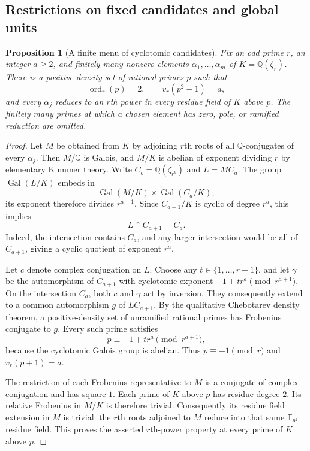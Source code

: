 \documentclass[11pt]{article}
\newcommand{\ord}{\operatorname{ord}}
\newtheorem{proposition}[theorem]{Proposition}
\theoremstyle{definition}
\theoremstyle{remark}
\begin{document}
\subsection{Restrictions on fixed candidates and global units}
\label{subsec:candidate-barriers}

\begin{proposition}[A finite menu of cyclotomic candidates]
\label{prop:fixed-cyclotomic-menu}
Fix an odd prime $r$, an integer $a\ge2$, and finitely many nonzero
elements $\alpha_1,\ldots,\alpha_m$ of $K=\mathbb Q(\zeta_r)$.
There is a positive-density set of rational primes $p$ such that
\[
 \ord_r(p)=2,\qquad v_r(p^2-1)=a,
\]
and every $\alpha_j$ reduces to an $r$th power in every residue
field of $K$ above $p$. The finitely many primes at which a chosen
element has zero, pole, or ramified reduction are omitted.
\end{proposition}

\begin{proof}
Let $M$ be obtained from $K$ by adjoining $r$th roots of all
$\mathbb Q$-conjugates of every $\alpha_j$.
Then $M/\mathbb Q$ is Galois, and $M/K$ is abelian of exponent
dividing $r$ by elementary Kummer theory.
Write $C_b=\mathbb Q(\zeta_{r^b})$ and $L=MC_a$.
The group $\operatorname{Gal}(L/K)$ embeds in
\[
 \operatorname{Gal}(M/K)\times\operatorname{Gal}(C_a/K);
\]
its exponent therefore divides $r^{a-1}$.
Since $C_{a+1}/K$ is cyclic of degree $r^a$, this implies
\[
 L\cap C_{a+1}=C_a.
\]
Indeed, the intersection contains $C_a$, and any larger
intersection would be all of $C_{a+1}$, giving a cyclic quotient
of exponent $r^a$.

Let $c$ denote complex conjugation on $L$.
Choose any $t\in\{1,\ldots,r-1\}$, and let $\gamma$ be the
automorphism of $C_{a+1}$ with cyclotomic exponent
$-1+tr^a\pmod{r^{a+1}}$.
On the intersection $C_a$, both $c$ and $\gamma$ act by
inversion. They consequently extend to a common automorphism
$g$ of $LC_{a+1}$.
By the qualitative Chebotarev density theorem, a positive-density
set of unramified rational primes has Frobenius conjugate to $g$.
Every such prime satisfies
\[
 p\equiv-1+tr^a\pmod{r^{a+1}},
\]
because the cyclotomic Galois group is abelian.
Thus $p\equiv-1\pmod r$ and $v_r(p+1)=a$.

The restriction of each Frobenius representative to $M$ is a
conjugate of complex conjugation and has square $1$.
Each prime of $K$ above $p$ has residue degree $2$.
Its relative Frobenius in $M/K$ is therefore trivial.
Consequently its residue field extension in $M$ is trivial:
the $r$th roots adjoined to $M$ reduce into that same
$\mathbb F_{p^2}$ residue field. This proves the asserted
$r$th-power property at every prime of $K$ above $p$.
\end{proof}
\end{document}
